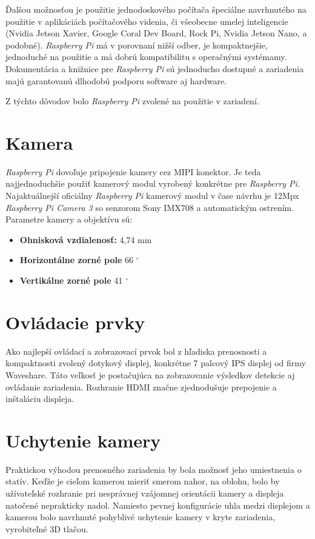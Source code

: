         Ďalšou možnosťou je použitie jednodoskového počítača špeciálne navrhnutého na použitie v aplikáciách počítačového videnia, či všeobecne umelej inteligencie (Nvidia Jetson Xavier, Google Coral Dev Board, Rock Pi, Nvidia Jetson Nano, a podobné). \emph{Raspberry Pi} má v porovnaní nižší odber, je kompaktnejšie, jednoduché na použitie a má dobrú kompatibilitu s operačnými systémamy. Dokumentácia a knižnice pre \emph{Raspberry Pi} sú jednoducho dostupné a zariadenia majú garantovanú dlhodobú podporu software aj hardware.

        Z týchto dôvodov bolo \emph{Raspberry Pi} zvolené na použitie v zariadení.

    \section{Kamera}

        \emph{Raspberry Pi} dovoľuje pripojenie kamery cez MIPI konektor. Je teda najjednoduchšie použiť kamerový modul vyrobený konkrétne pre \emph{Raspberry Pi}. Najaktuálnejší oficiálny \emph{Raspberry Pi} kamerový modul v čase návrhu je 12Mpx \emph{Raspberry Pi Camera 3} so senzorom Sony IMX708 a automatickým ostrením. Parametre kamery a objektívu sú:
        \begin{itemize}
            \item \textbf{Ohnisková vzdialenosť:} 4,74 mm
            \item \textbf{Horizontálne zorné pole} 66 \(^\circ\)
            \item \textbf{Vertikálne zorné pole} 41 \(^\circ\)
        \end{itemize}

    \section{Ovládacie prvky}

        Ako najlepší ovládací a zobrazovací prvok bol z hľadiska prenosnosti a kompaktnosti zvolený dotykový displej, konkrétne 7 palcový IPS displej od firmy Waveshare. Táto veľkosť je postačujúca na zobrazovanie výsledkov detekcie aj ovládanie zariadenia. Rozhranie HDMI značne zjednodušuje prepojenie a inštaláciu displeja.

    \section{Uchytenie kamery}

        Praktickou výhodou prenosného zariadenia by bola možnosť jeho umiestnenia o statív. Keďže je cieľom kamerou mieriť smerom nahor, na oblohu, bolo by užívateľské rozhranie pri nesprávnej vzájomnej orientácii kamery a displeja natočené neprakticky nadol. Namiesto pevnej konfigurácie uhla medzi displejom a kamerou bolo navrhnuté pohyblivé uchytenie kamery v kryte zariadenia, vyrobiteľné 3D tlačou.

